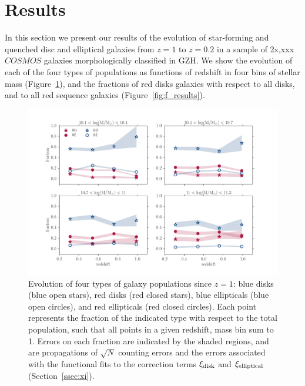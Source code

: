 \documentclass[useAMS,usenatbib]{mn2e}
\begin{document}
\section{Results}
\label{sec:results}
In this section we present our results of the evolution of star-forming and quenched disc and elliptical galaxies from $z=1$ to $z=0.2$ in a sample of 2x,xxx $COSMOS$ galaxies morphologically classified in GZH. We show the evolution of each of the four types of populations as functions of redshift in four bins of stellar mass (Figure~\ref{fig:all_plot}), and the fractions of red disks galaxies with respect to all disks, and to all red sequence galaxies (Figure~\ref{fig:f_results}).

\begin{figure}
\centering
\includegraphics[width=\textwidth,trim={0cm 0cm 2cm 1cm},clip]{figures/morphologies_evolved.pdf}
\caption{Evolution of four types of galaxy populations since $z=1$: blue disks (blue open stars), red disks (red closed stars), blue ellipticals (blue open circles), and red ellipticals (red closed circles). Each point represents the fraction of the indicated type with respect to the total population, such that all points in a given redshift, mass bin sum to 1. Errors on each fraction are indicated by the shaded regions, and are propagations of $\sqrt{N}$ counting errors and the errors associated with the functional fits to the correction terms $\xi_{\rm disk}$ and $\xi_{\rm elliptical}$ (Section~\ref{ssec:xi}). }
\label{fig:all_plot}
\end{figure}
\end{document}
